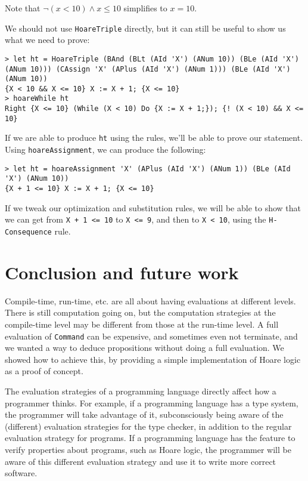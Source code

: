 \documentclass{article}
\begin{document}
Note that $\neg (x < 10) \land x \le 10$ simplifies to $x = 10$.

We should not use \texttt{HoareTriple} directly, but it can still be useful to show us what we need to prove:

\begin{lstlisting}
> let ht = HoareTriple (BAnd (BLt (AId 'X') (ANum 10)) (BLe (AId 'X') (ANum 10))) (CAssign 'X' (APlus (AId 'X') (ANum 1))) (BLe (AId 'X') (ANum 10))
{X < 10 && X <= 10} X := X + 1; {X <= 10}
> hoareWhile ht
Right {X <= 10} (While (X < 10) Do {X := X + 1;}); {! (X < 10) && X <= 10}
\end{lstlisting}

If we are able to produce \texttt{ht} using the rules, we'll be able to prove our statement. Using \texttt{hoareAssignment}, we can produce the following:

\begin{lstlisting}
> let ht = hoareAssignment 'X' (APlus (AId 'X') (ANum 1)) (BLe (AId 'X') (ANum 10))
{X + 1 <= 10} X := X + 1; {X <= 10}
\end{lstlisting}

If we tweak our optimization and substitution rules, we will be able to show that we can get from \texttt{X + 1 <= 10} to \texttt{X <= 9}, and then to \texttt{X < 10}, using the \texttt{H-Consequence} rule.

\section{Conclusion and future work}

Compile-time, run-time, etc. are all about having evaluations at different levels. There is still computation going on, but the computation strategies at the compile-time level may be different from those at the run-time level. A full evaluation of \texttt{Command} can be expensive, and sometimes even not terminate, and we wanted a way to deduce propositions without doing a full evaluation. We showed how to achieve this, by providing a simple implementation of Hoare logic as a proof of concept.

The evaluation strategies of a programming language directly affect how a programmer thinks. For example, if a programming language has a type system, the programmer will take advantage of it, subconsciously being aware of the (different) evaluation strategies for the type checker, in addition to the regular evaluation strategy for programs. If a programming language has the feature to verify properties about programs, such as Hoare logic, the programmer will be aware of this different evaluation strategy and use it to write more correct software.
\end{document}
